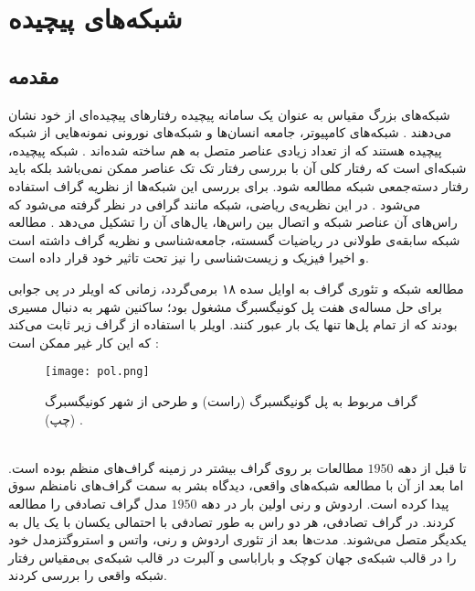 \chapter{شبکه‌های پیچیده }
\section{مقدمه}
  شبکه‌های بزرگ مقیاس به عنوان یک سامانه پیچیده رفتارهای پیچیده‌ای از خود نشان می‌دهند \cite{boccara}. شبکه‌های کامپیوتر، جامعه انسان‌ها  و شبکه‌های نورونی نمونه‌هایی از شبکه پیچیده هستند که از تعداد زیادی عناصر متصل به هم ساخته شده‌اند \cite{newman}. شبکه پیچیده، شبکه‌ای است  که رفتار کلی آن با بررسی رفتار تک تک عناصر ممکن نمی‌باشد بلکه باید رفتار دسته‌جمعی شبکه مطالعه شود. برای بررسی این شبکه‌ها از نظریه گراف استفاده می‌شود \cite{costa}. در این نظریه‌ی ریاضی، شبکه مانند گرافی در نظر گرفته می‌شود  که راس‌های آن عناصر شبکه و اتصال‌ بین راس‌ها، یال‌های آن را تشکیل می‌دهد \cite{boc,albert}. مطالعه شبکه سابقه‌ی طولانی در ریاضیات گسسته، جامعه‌شناسی و نظریه گراف داشته است و اخیرا فیزیک و زیست‌شناسی را نیز تحت تاثیر خود قرار داده است. 

مطالعه شبکه و تئوری گراف به اوایل سده ۱۸ برمی‌گردد، زمانی‌ که اویلر در پی جوابی برای حل مساله‌ی هفت پل کونیگسبرگ مشغول بود؛ ساکنین شهر به دنبال مسیری بودند که از تمام پل‌ها تنها یک بار عبور کنند. اویلر با استفاده از گراف زیر ثابت می‌کند که این کار غیر ممکن است \cite{network,west}:
\begin{figure}[htbp]
\centering
\texttt{[image: pol.png]} 
\caption[گراف مربوط به پل گونیگسبرگ] {\footnotesize گراف مربوط به پل گونیگسبرگ (راست) و طرحی از شهر کونیگسبرگ (چپ) \cite{network}.}
\label{fig:pol}
\end{figure}\\

تا قبل از دهه  $1950$ مطالعات بر روی گراف بیشتر در زمینه گراف‌های منظم بوده است. اما بعد از آن با مطالعه شبکه‌های واقعی، دیدگاه بشر به سمت گراف‌های نامنظم سوق پیدا کرده است. اردوش و رنی  اولین بار در دهه $1950$ مدل گراف تصادفی را مطالعه کردند. در گراف تصادفی، هر دو راس  به طور تصادفی  با احتمالی یکسان با یک یال به یکدیگر متصل می‌شوند.  مدت‌ها بعد از تئوری اردوش و رنی، واتس و استروگتزمدل خود را در قالب شبکه‌ی جهان کوچک \cite{watts} و   باراباسی و آلبرت  در قالب شبکه‌ی بی‌مقیاس  \cite{bara} رفتار شبکه‌ واقعی را بررسی کردند.

